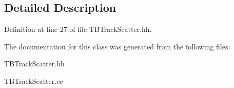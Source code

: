 \subsection{Detailed Description}


Definition at line 27 of file TBTrackScatter.hh.

The documentation for this class was generated from the following files:\begin{DoxyCompactItemize}
\item 
TBTrackScatter.hh\item 
TBTrackScatter.cc\end{DoxyCompactItemize}
